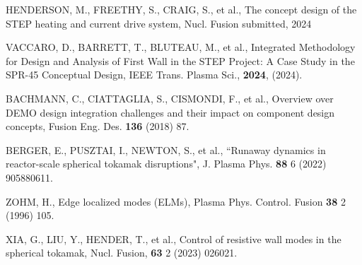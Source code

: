 \documentclass[10pt, a4paper, twoside]{article}
\begin{document}
\begin{thebibliography}{9}
    HENDERSON, M., FREETHY, S., CRAIG, S., et al., 
    The concept design of the STEP heating and current drive system,
    Nucl. Fusion
    submitted, 
    2024

    VACCARO, D., BARRETT, T., BLUTEAU, M., et al.,
    Integrated Methodology for Design and Analysis of First Wall in the STEP Project: A Case Study in the SPR-45 Conceptual Design,
    IEEE Trans. Plasma Sci.,
    \textbf{2024},
    (2024).

    BACHMANN, C., CIATTAGLIA, S., CISMONDI, F., et al., 
    Overview over DEMO design integration challenges and their impact on component design concepts, 
    Fusion Eng. Des. 
    \textbf{136} 
    (2018)
    87.


    BERGER, E., PUSZTAI, I., NEWTON, S., et al.,
    ``Runaway dynamics in reactor-scale spherical tokamak disruptions",
    J. Plasma Phys. 
    \textbf{88} 6 
    (2022)
    905880611.

    ZOHM, H., 
    Edge localized modes (ELMs), 
    Plasma Phys. Control. Fusion 
    \textbf{38} 2 
    (1996) 
    105.

    XIA, G., LIU, Y., HENDER, T., et al.,
    Control of resistive wall modes in the spherical tokamak,
    Nucl. Fusion,
    \textbf{63} 2
    (2023)
    026021.


\end{thebibliography}
\end{document}
